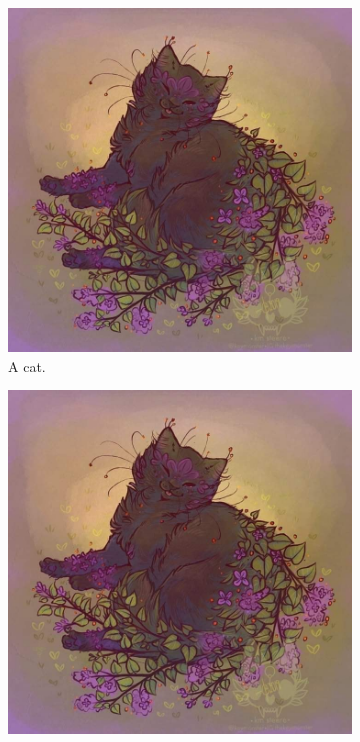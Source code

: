 \documentclass{article}
\begin{document}
\begin{figure}[H]
  \centering
  \begin{subfigure}[b]{0.2\linewidth}
    \includegraphics[width=\linewidth]{cat.jpg}
     \caption{A cat.}
  \end{subfigure}
  \begin{subfigure}[b]{0.2\linewidth}
    \includegraphics[width=\linewidth]{cat.jpg}

\end{subfigure}
\end{figure}
\end{document}
